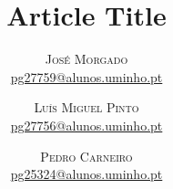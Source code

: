 \documentclass[twoside]{article}
\title{\vspace{-15mm}\fontsize{24pt}{10pt}\selectfont\textbf{Article Title}} %
\author{
  \large
  \textsc{José Morgado}\\
  \normalsize \href{mailto:pg27759@alunos.uminho.pt}{pg27759@alunos.uminho.pt} %
  \vspace{-5mm}
\and
  \large
  \textsc{Luís Miguel Pinto}\\
  \normalsize \href{mailto:pg27756@alunos.uminho.pt}{pg27756@alunos.uminho.pt}\\ %
  \vspace{-5mm}
\and
  \large
  \textsc{Pedro Carneiro}\\
  \normalsize \href{mailto:pg25324@alunos.uminho.pt}{pg25324@alunos.uminho.pt} %
  \vspace{-5mm}
}
\date{}
\begin{document}
\maketitle %

\thispagestyle{fancy} %



\begin{multicols}{2} %










\end{multicols}
\end{document}

